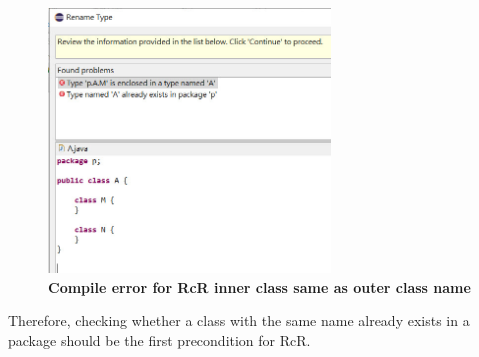 \begin{figure}[H]
\centerline{\includegraphics[width=75mm,scale=0.4]{NC3.jpg}}
\caption{\textbf{Compile error for RcR inner class same as outer class name}}
\label{fig:NC3}
\end{figure}

Therefore, checking whether a class with the same name already exists in a package should be the first precondition for RcR. 
   
